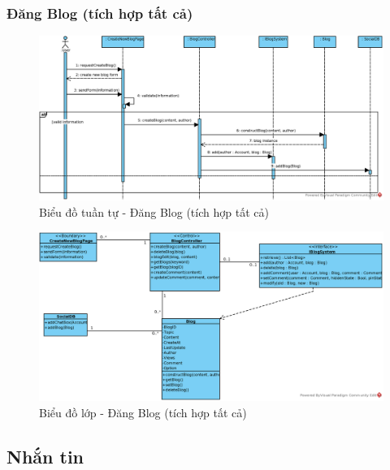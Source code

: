 \documentclass[./../main.tex]{subfiles}
\begin{document}
\subsubsection{Đăng Blog (tích hợp tất cả)}
\begin{figure}[H]
    \centering
    \includegraphics[width=\linewidth]{./images/UseCaseDesignDiagram/ucr_per_create_blog.eps}
    \caption{Biểu đồ tuần tự - Đăng Blog (tích hợp tất cả)}
\end{figure}
\begin{figure}[H]
    \centering
    \includegraphics[width=\linewidth]{./images/UseCaseDesignDiagram/ucd_per_blog.eps}
    \caption{Biểu đồ lớp - Đăng Blog (tích hợp tất cả)}
\end{figure}

\subsection{Nhắn tin}
\end{document}
